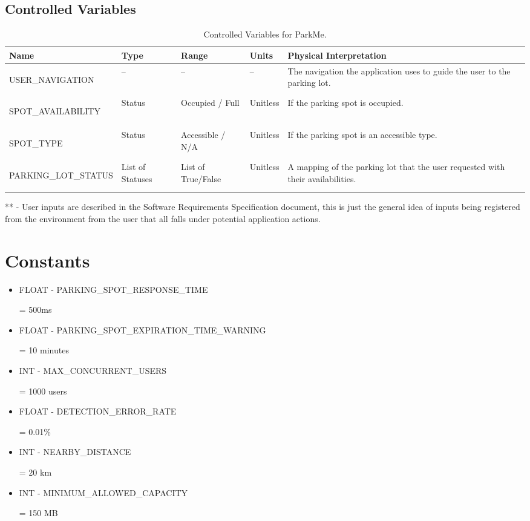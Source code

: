 \documentclass[]{article}
\begin{document}
	\subsection{Controlled Variables}
	\begin{table}[H]
		\begin{tabular}{ | m{5cm} | m{2cm}| m{1.5cm}| m{2cm}| m{3cm} |} 
			\hline
			Name & Type & Range & Units & Physical Interpretation \\ [0.5ex] 
			\hline
			\hypertarget{UNAV}{USER\_NAVIGATION} & -- & -- & -- & The navigation the application uses to guide the user to the parking lot. \\ 
			\hline
			\hypertarget{PSAVAIL}{SPOT\_AVAILABILITY} & Status & Occupied / Full & Unitless & If the parking  spot is occupied. \\
			\hline
			\hypertarget{PSTYPE}{SPOT\_TYPE} & Status & Accessible / N/A & Unitless & If the parking  spot is an  accessible type. \\
			\hline
			\hypertarget{PLSTAT}{PARKING\_LOT\_STATUS} & List of Statuses & List of True/False & Unitless & A mapping of the parking lot that the user requested with their availabilities. \\ 
			\hline 
		\end{tabular}
		\caption{Controlled Variables for ParkMe.}
		** - User inputs are described in the Software Requirements Specification document, this is just the general idea of inputs being registered from the environment from the user that all falls under potential application actions.
	\end{table}
	
	\section{Constants}
	\begin{itemize}
		\item \hypertarget{RESPONSETIME}{FLOAT - PARKING\_SPOT\_RESPONSE\_TIME} = 500ms 
		
		\item \hypertarget{EXPTIME}{FLOAT - PARKING\_SPOT\_EXPIRATION\_TIME\_WARNING }= 10 minutes
		
		\item \hypertarget{CONCUSERS}{INT - MAX\_CONCURRENT\_USERS} = 1000 users
		
		\item \hypertarget{DETERR}{FLOAT - DETECTION\_ERROR\_RATE} = 0.01\%
		
		\item \hypertarget{NBDST}{INT - NEARBY\_DISTANCE} = 20 km
		
		\item \hypertarget{MINCAP}{INT - MINIMUM\_ALLOWED\_CAPACITY} = 150 MB
	\end{itemize}
	
\end{document}
